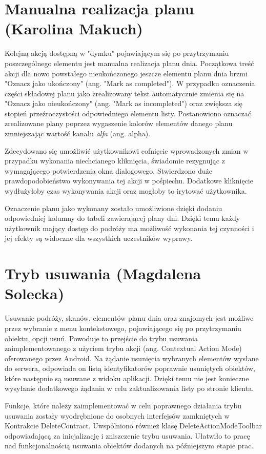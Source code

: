 \documentclass[10pt,twoside,a4paper]{report}
\begin{document}
\section{Manualna realizacja planu (Karolina Makuch)}
\par  Kolejną akcją dostępną w "dymku" pojawiającym się po przytrzymaniu poszczególnego elementu jest manualna realizacja planu dnia. Początkowa treść akcji dla nowo powstałego nieukończonego jeszcze elementu planu dnia brzmi "Oznacz jako ukończony" (ang. "Mark as completed"). W przypadku oznaczenia części składowej planu jako zrealizowany tekst automatycznie zmienia się na "Oznacz jako nieukończony" (ang. "Mark as incompleted") oraz zwiększa się stopień przeźroczystości odpowiedniego elementu listy. Postanowiono oznaczać zrealizowane plany poprzez wygaszenie kolorów elementów danego planu zmniejszając wartość kanału \textit{alfa} (ang. alpha).
 \par Zdecydowano się umożliwić użytkownikowi cofnięcie wprowadzonych zmian w przypadku wykonania niechcianego kliknięcia, świadomie rezygnując z wymagającego potwierdzenia okna dialogowego. Stwierdzono duże prawdopodobieństwo wykonywania tej akcji w pośpiechu. Dodatkowe kliknięcie wydłużyłoby czas wykonywania akcji oraz mogłoby to irytować użytkownika.
\par  Oznaczenie planu jako wykonany zostało umożliwione dzięki dodaniu odpowiedniej kolumny do tabeli zawierającej plany dni. Dzięki temu każdy użytkownik mający dostęp do podróży ma możliwość wykonania tej czynności i jej efekty są widoczne dla wszystkich uczestników wyprawy.

\section{Tryb usuwania (Magdalena Solecka)}
\par Usuwanie podróży, skanów, elementów planu dnia oraz znajomych jest możliwe przez wybranie z menu kontekstowego, pojawiającego się po przytrzymaniu obiektu, opcji usuń. Powoduje to przejście do trybu usuwania zaimplementowanego z użyciem trybu akcji (ang. Contextual Action Mode)\cite{contextualActionMode} oferowanego przez Android. Na żądanie usunięcia wybranych elementów wysłane do serwera, odpowiada on listą identyfikatorów poprawnie usuniętych  obiektów, które następnie są usuwane z widoku aplikacji. Dzięki temu nie jest konieczne wysyłanie dodatkowego żądania w celu zaktualizowania listy po stronie klienta.
\par Funkcje, które należy zaimplementować w celu poprawnego działania trybu usuwania zostały wyodrębnione do osobnych interfejsów zamkniętych w Kontrakcie DeleteContract. Uwspólniono również klasę DeleteActionModeToolbar odpowiadającą za inicjalizację i zniszczenie trybu usuwania. Ułatwiło to pracę nad funkcjonalnością usuwania obiektów dodanych na późniejszym etapie prac.
\end{document}
